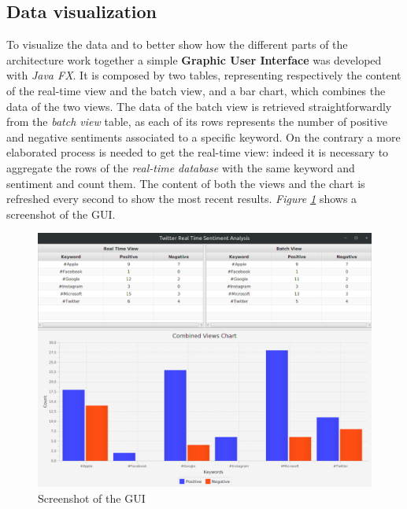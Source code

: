 \documentclass[10pt,twocolumn,letterpaper]{article}
\begin{document}

\subsection{Data visualization}
To visualize the data and to better show how the different parts of the architecture work together a simple \textbf{Graphic User Interface} was developed with \emph{Java FX}. It is composed by two tables, representing respectively the content of the real-time view and the batch view, and a bar chart, which combines the data of the two views. The data of the batch view is retrieved straightforwardly from the \emph{batch view} table, as each of its rows represents the number of positive and negative sentiments associated to a specific keyword. On the contrary a more elaborated process is needed to get the real-time view: indeed it is necessary to aggregate the rows of the \emph{real-time database} with the same keyword and sentiment and count them. The content of both the views and the chart is refreshed every second to show the most recent results. \emph{Figure \ref{fig:GUI_screenshot}} shows a screenshot of the GUI.

\begin{figure}[h!]
\includegraphics[width=0.98\linewidth]{img/GUI.png}
\vspace{0.25cm}
\caption{Screenshot of the GUI}
\label{fig:GUI_screenshot}
\end{figure}

\end{document}
